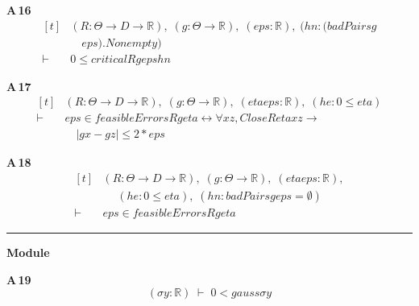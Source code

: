 \noindent\textbf{A\,16}\quad{}
{\footnotesize\[ \begin{aligned}[t]
&(\mathit{R} : \Theta \to \mathit{D} \to \mathbb{R} ),\; (\mathit{g} : \Theta \to \mathbb{R} ),\; (\mathit{eps} : \mathbb{R} ),\; (\mathit{hn} : (\mathit{badPairs} \mathit{g}\\
&\quad \mathit{eps}).\mathit{Nonempty})\\
\vdash\;&0 \leq \mathit{critical} \mathit{R} \mathit{g} \mathit{eps} \mathit{hn}
\end{aligned} \]}

\noindent\textbf{A\,17}\quad{}
{\footnotesize\[ \begin{aligned}[t]
&(\mathit{R} : \Theta \to \mathit{D} \to \mathbb{R} ),\; (\mathit{g} : \Theta \to \mathbb{R} ),\; (\mathit{eta} \mathit{eps} : \mathbb{R} ),\; (\mathit{he} : 0 \leq \mathit{eta})\\
\vdash\;&\mathit{eps} \in \mathit{feasibleErrors} \mathit{R} \mathit{g} \mathit{eta} \leftrightarrow \forall \mathit{x} \mathit{z},\mathit{Close} \mathit{R} \mathit{eta} \mathit{x} \mathit{z} \to\\
&\quad |\mathit{g} \mathit{x}-\mathit{g} \mathit{z}| \leq 2*\mathit{eps}
\end{aligned} \]}

\noindent\textbf{A\,18}\quad{}
{\footnotesize\[ \begin{aligned}[t]
&(\mathit{R} : \Theta \to \mathit{D} \to \mathbb{R} ),\; (\mathit{g} : \Theta \to \mathbb{R} ),\; (\mathit{eta} \mathit{eps} : \mathbb{R} ),\\
&\quad \; (\mathit{he} : 0 \leq \mathit{eta}),\; (\mathit{hn} : \mathit{badPairs} \mathit{g} \mathit{eps}=\emptyset )\\
\vdash\;&\mathit{eps} \in \mathit{feasibleErrors} \mathit{R} \mathit{g} \mathit{eta}
\end{aligned} \]}

\vspace{4pt}\noindent\rule{\columnwidth}{0.4pt}\par\vspace{2pt}
\noindent\textbf{Module }\par\vspace{3pt}

\noindent\textbf{A\,19}\quad{}
{\footnotesize\[ (\sigma \mathit{y} : \mathbb{R} ) \;\vdash\; 0 < \mathit{gauss} \sigma \mathit{y} \]}

